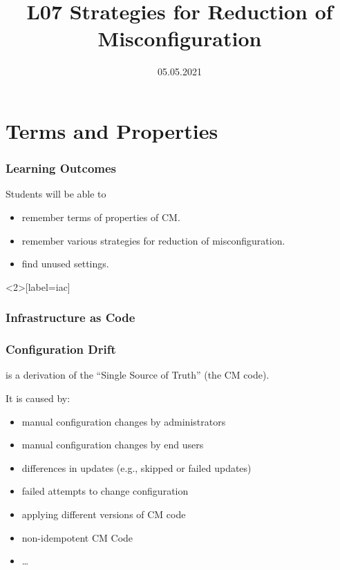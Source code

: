 

\title{L07 Strategies for Reduction of Misconfiguration}
\date{05.05.2021}




\section{Terms and Properties}

\begin{frame}
	\frametitle{Learning Outcomes}
	Students will be able to
	\begin{itemize}
	\item remember terms of properties of CM.
	\item remember various strategies for reduction of misconfiguration.
	\item find unused settings.
	\end{itemize}
\end{frame}

\begin{frame}<2>[label=iac]
	\frametitle{Infrastructure as Code}

\end{frame}

\begin{frame}
	\frametitle{Configuration Drift}

	is a derivation of the ``Single Source of Truth'' (the CM code).

	\vspace{1em}
	It is caused by:

	\pause

	\begin{itemize}[<+-| alert@+>]
	\item manual configuration changes by administrators
	\item manual configuration changes by end users
	\item differences in updates (e.g., skipped or failed updates)
	\item failed attempts to change configuration
	\item applying different versions of CM code
	\item non-idempotent CM Code
	\item \dots
	\end{itemize}
\end{frame}

